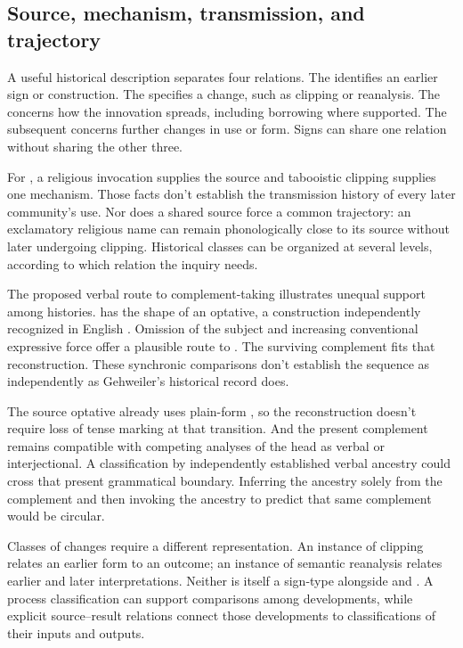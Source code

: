 \documentclass[12pt]{article}
\begin{document}
\subsection{Source, mechanism, transmission, and trajectory}

A useful historical description separates four relations. The
 identifies an earlier sign or construction. The
 specifies a change, such as clipping or reanalysis.
The  concerns how the innovation spreads,
including borrowing where supported. The subsequent 
concerns further changes in use or form. Signs can share one relation
without sharing the other three.

For , a religious invocation supplies the source and
tabooistic clipping supplies one mechanism. Those facts don't establish
the transmission history of every later community's use. Nor does a
shared source force a common trajectory: an exclamatory religious name
can remain phonologically close to its source without later undergoing
clipping. Historical classes can be organized at several
levels, according to which relation the inquiry needs.

The proposed verbal route to complement-taking  illustrates
unequal support among histories.  has the shape
of an optative, a construction independently recognized in English
\citep[944]{HuddlestonPullum2002}. Omission of the subject and increasing
conventional expressive force offer a plausible route to . The surviving complement fits that reconstruction. These synchronic
comparisons don't establish the sequence as independently as Gehweiler's
historical record does.

The source optative already uses plain-form , so the
reconstruction doesn't require loss of tense marking at that transition.
And the present complement remains compatible with competing analyses
of the head as verbal or interjectional. A classification by independently
established verbal ancestry could cross that present grammatical boundary.
Inferring the ancestry solely from the complement and then invoking
the ancestry to predict that same complement would be circular.

Classes of changes require a different representation. An instance of
clipping relates an earlier form to an outcome; an instance of semantic
reanalysis relates earlier and later interpretations. Neither is itself
a sign-type alongside  and . A process
classification can support comparisons among developments, while explicit
source--result relations connect those developments to classifications
of their inputs and outputs.
\end{document}
